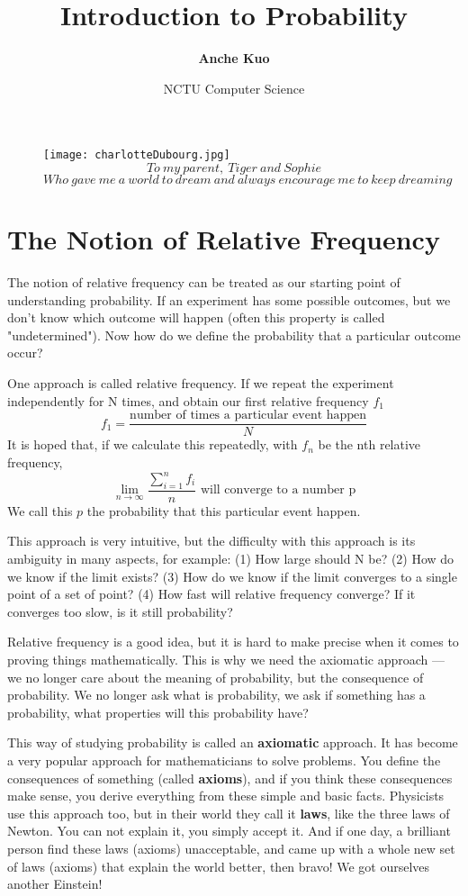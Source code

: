 \documentclass[a4paper,12pt]{article}
\title{\textbf{Introduction to Probability}}
\author{\textbf{Anche Kuo}}
\date{NCTU Computer Science}
\begin{document}
\maketitle

\begin{figure}[ht!]
\centering
\texttt{[image: charlotteDubourg.jpg]}
 
$$To\ my\ parent,\ Tiger\ and\ Sophie$$
$$Who\ gave\ me\ a\ world\ to\ dream\ and\ always\ encourage\ me\ to\ keep\ dreaming$$
\label{overflow}
\end{figure}

\newpage
\tableofcontents

\newpage
\section{The Notion of Relative Frequency}
The notion of relative frequency can be treated as our starting point of understanding probability. If an experiment has some possible outcomes, but we don't know which outcome will happen (often this property is called "undetermined"). Now how do we define the probability that a particular outcome occur?

One approach is called relative frequency. If we repeat the experiment independently for N times, and obtain our first relative frequency $f_1$ $$f_1 = \frac{\text{number of times a particular event happen}}{N}$$It is hoped that, if we calculate this repeatedly, with $f_n$ be the nth relative frequency,$$\lim_{n\to\infty}\frac{\sum_{i=1}^n f_i}{n} \text{ will converge to a number p}$$We call this $p$ the probability that this particular event happen.

This approach is very intuitive, but the difficulty with this approach is its ambiguity in many aspects, for example: 
(1) How large should N be? 
(2) How do we know if the limit exists? 
(3) How do we know if the limit converges to a single point of a set of point? 
(4) How fast will relative frequency converge? If it converges too slow, is it still probability? 

Relative frequency is a good idea, but it is hard to make precise when it comes to proving things mathematically. This is why we need the axiomatic approach \---- we no longer care about the meaning of probability, but the consequence of probability. We no longer ask what is probability, we ask if something has a probability, what properties will this probability have?

This way of studying probability is called an \textbf{axiomatic} approach. It has become a very popular approach for mathematicians to solve problems. You define the consequences of something (called \textbf{axioms}), and if you think these consequences make sense, you derive everything from these simple and basic facts. Physicists use this approach too, but in their world they call it \textbf{laws}, like the three laws of Newton. You can not explain it, you simply accept it. And if one day, a brilliant person find these laws (axioms) unacceptable, and came up with a whole new set of laws (axioms) that explain the world better, then bravo! We got ourselves another Einstein!
\end{document}
